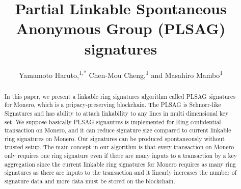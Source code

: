 \documentclass[letterpaper,10pt]{article}
\newcommand\authormark[1]{\textsuperscript{#1}}
\begin{document}
\title{Partial Linkable Spontaneous Anonymous Group (PLSAG) signatures}


\author{Yamamoto Haruto,\authormark{1,*} Chen-Mou Cheng,\authormark{1} and Masahiro Mambo\authormark{1}}

\address{\authormark{1} Kanazawa University, School of Information and Communication Engineering, Information Security Lab}
\address{\authormark{2} }

\email{\authormark{*}haruto.y0327@gmail.com} %



\begin{abstract}
In this paper, we present a linkable ring signatures algorithm called PLSAG signatures for Monero, which is a pripacy-preserving blockchain. The PLSAG is Schnorr-like Signatures and has ability to attach linkability to any lines in multi dimensional key set.
We suppose basically PLSAG signautres is implemented for Ring confidential transaction on Monero, and it can reduce signature size compared to current linkable ring signatures on Monero.
Our signatures can be produced spontaneously without trusted setup. 
The main concept in our algorithm is that every transaction on Monero only requires one ring signature even if there are many inputs to a transaction by a key aggregation since the current linkable ring signatures for Monero requires as many ring signatures as there are inputs to the transaction and it linearly increases the number of signature data and more data must be stored on the blockchain.

\end{abstract}
\end{document}
